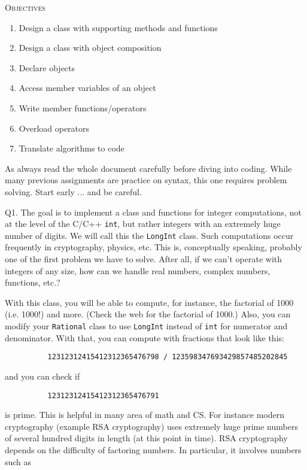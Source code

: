 


\renewcommand\TITLE{Assignment 11}


\topmatter

\textsc{Objectives}     
\begin{enumerate}[nosep]
        \item Design a class with supporting methods and functions
        \item Design a class with object composition
        \item Declare objects
        \item Access member variables of an object
        \item Write member functions/operators
        \item Overload operators
        \item Translate algorithms to code
    \end{enumerate}

As always read the whole document carefully before diving into coding.
While many previous assignments are practice on syntax, this one
requires problem solving.
Start early ... and be careful.

\newpage
Q1.
The goal is to implement a class and functions for integer 
computations, not at the level of the C/C++ \verb!int!, but rather integers with 
an extremely huge number of digits. We will call this the \verb!LongInt! class. 
Such computations occur frequently in cryptography, physics, etc. This is, 
conceptually speaking, probably one of the first problem we have to solve. 
After all, if we can't operate with integers of any size, how can we handle 
real numbers, complex numbers, functions, etc.?

With this class, you will be able to compute, for instance, the factorial of 
1000 (i.e. 1000!) and more.
(Check the web for the factorial of 1000.) Also, you can 
modify your \verb!Rational! class to use \verb!LongInt! instead of \verb!int! 
for numerator and denominator. With that, you can compute with fractions that 
look like this:

\verb!          12312312415412312365476798 / 123598347693429857485202845!

and you can check if

\verb!          12312312415412312365476791!

is prime.
This is helpful in many area of math and CS. For instance modern 
cryptography (example RSA cryptography) uses extremely huge prime numbers 
of several hundred digits in length (at this point in time). RSA cryptography 
depends on the difficulty of factoring numbers. In particular, it involves 
numbers such as

